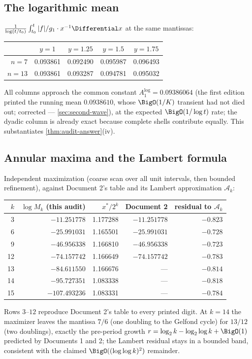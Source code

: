 \documentclass[11pt,oneside]{article}
\theoremstyle{definition}
\theoremstyle{remark}
\begin{document}
\subsection{The logarithmic mean}
\label{ssec:logmean}

$\frac{1}{\log(t/t_0)}\int_{t_0}^{t}|f|/g_1\cdot x^{-1}\Differential x$ at the same
mantissas:
\begin{center}
\small
\begin{tabular}{@{}rcccc@{}}
\toprule
 & $y=1$ & $y=1.25$ & $y=1.5$ & $y=1.75$\\
\midrule
$n=7$  & 0.093861 & 0.092490 & 0.095987 & 0.096493\\
$n=13$ & 0.093861 & 0.093287 & 0.094781 & 0.095032\\
\bottomrule
\end{tabular}
\end{center}
All columns approach the common constant
$A_1^{\log}=0.09386064$ (the first edition printed the running mean
$0.0938610$, whose $\BigO(1/K)$ transient had not died out;
corrected --- \cref{sec:second-wave}), at the
expected $\BigO(1/\log t)$ rate; the dyadic column is already exact
because complete shells contribute equally.  This substantiates
\cref{thm:audit-answer}(iv).

\subsection{Annular maxima and the Lambert formula}
\label{ssec:maxima}

Independent maximization (coarse scan over all unit intervals, then
bounded refinement), against Document 2's table and its Lambert
approximation $\mathcal A_k$:
\begin{center}
\small
\begin{tabular}{@{}rrrrr@{}}
\toprule
$k$ & $\log M_k$ (this audit) & $x^*/2^k$ & Document 2 & residual to
$\mathcal A_k$\\
\midrule
3  & $-11.251778$ & 1.177288 & $-11.251778$ & $-0.823$\\
6  & $-25.991031$ & 1.165501 & $-25.991031$ & $-0.728$\\
9  & $-46.956338$ & 1.166810 & $-46.956338$ & $-0.723$\\
12 & $-74.157742$ & 1.166649 & $-74.157742$ & $-0.783$\\
13 & $-84.611550$ & 1.166676 & --- & $-0.814$\\
14 & $-95.727351$ & 1.083338 & --- & $-0.818$\\
15 & $-107.493236$ & 1.083331 & --- & $-0.784$\\
\bottomrule
\end{tabular}
\end{center}
Rows $3$--$12$ reproduce Document 2's table to every printed digit.  At
$k=14$ the maximizer leaves the mantissa $7/6$ (one doubling to the
Gelfond cycle) for $13/12$ (two doublings), exactly the pre-period growth
$r=\log_2k-\log_2\log k+\BigO(1)$ predicted by Documents 1 and 2; the
Lambert residual stays in a bounded band, consistent with the claimed
$\BigO((\log\log k)^2)$ remainder.
\end{document}
